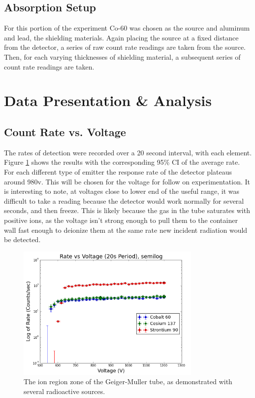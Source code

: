 \documentclass[aps,twocolumn,secnumarabic,balancelastpage,amsmath,amssymb,nofootinbib]{revtex4}
\begin{document}
\subsection{Absorption Setup}
For this portion of the experiment Co-60 was chosen as the source and aluminum and lead, the shielding materials. Again placing the source at a fixed distance from the detector, a series of raw count rate readings are taken from the source. Then, for each varying thicknesses of shielding material, a subsequent series of count rate readings are taken.

\section{Data Presentation \& Analysis}
\subsection{Count Rate vs. Voltage}
The rates of detection were recorded over a 20 second interval, with each element. Figure \ref{fig:RateVsVolt} shows the results with the corresponding 95\% CI of the average rate. For each different type of emitter the response rate of the detector plateaus around 980v. This will be chosen for the voltage for follow on experimentation. It is interesting to note, at voltages close to lower end of the useful range, it was difficult to take a reading because the detector would work normally for several seconds, and then freeze. This is likely because the gas in the tube saturates with positive ions, as the voltage isn't strong enough to pull them to the container wall fast enough to deionize them at the same rate new incident radiation would be detected.
\begin{figure}[h]
\includegraphics[width=9cm]{RateVsVolt}
\caption{The ion region zone of the Geiger-Muller tube, as demonstrated with several radioactive sources.}
\label{fig:RateVsVolt}
\end{figure}
\end{document}
